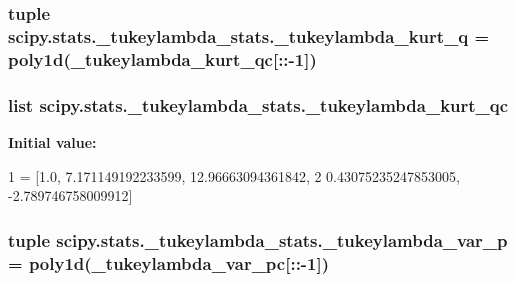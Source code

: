 \subsubsection[{\+\_\+tukeylambda\+\_\+kurt\+\_\+q}]{\setlength{\rightskip}{0pt plus 5cm}tuple scipy.\+stats.\+\_\+tukeylambda\+\_\+stats.\+\_\+tukeylambda\+\_\+kurt\+\_\+q = poly1d({\bf \+\_\+tukeylambda\+\_\+kurt\+\_\+qc}\mbox{[}\+::-\/1\mbox{]})}\label{namespacescipy_1_1stats_1_1__tukeylambda__stats_acc6f2e4f32724a25a99585e8421f9840}
\hypertarget{namespacescipy_1_1stats_1_1__tukeylambda__stats_ab4e409fa96770e89cefeacb192388961}{}
\subsubsection[{\+\_\+tukeylambda\+\_\+kurt\+\_\+qc}]{\setlength{\rightskip}{0pt plus 5cm}list scipy.\+stats.\+\_\+tukeylambda\+\_\+stats.\+\_\+tukeylambda\+\_\+kurt\+\_\+qc}\label{namespacescipy_1_1stats_1_1__tukeylambda__stats_ab4e409fa96770e89cefeacb192388961}
{\bfseries Initial value\+:}
\begin{DoxyCode}
1 = [1.0, 7.171149192233599, 12.96663094361842,
2                         0.43075235247853005, -2.789746758009912]
\end{DoxyCode}
\hypertarget{namespacescipy_1_1stats_1_1__tukeylambda__stats_a40019a60ee1e0688ddfb01a54ba693d7}{}
\subsubsection[{\+\_\+tukeylambda\+\_\+var\+\_\+p}]{\setlength{\rightskip}{0pt plus 5cm}tuple scipy.\+stats.\+\_\+tukeylambda\+\_\+stats.\+\_\+tukeylambda\+\_\+var\+\_\+p = poly1d({\bf \+\_\+tukeylambda\+\_\+var\+\_\+pc}\mbox{[}\+::-\/1\mbox{]})}\label{namespacescipy_1_1stats_1_1__tukeylambda__stats_a40019a60ee1e0688ddfb01a54ba693d7}
\hypertarget{namespacescipy_1_1stats_1_1__tukeylambda__stats_aab4deaecc63977072b318727f8f49cc1}{}
